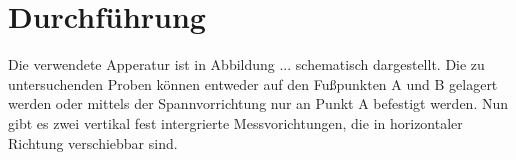 \section{Durchführung}
\label{sec:Durchführung}

Die verwendete Apperatur ist in Abbildung ... schematisch dargestellt.
Die zu untersuchenden Proben können entweder auf den Fußpunkten A und B 
gelagert werden oder mittels der Spannvorrichtung nur an Punkt A befestigt werden.
Nun gibt es zwei vertikal fest intergrierte Messvorichtungen, die in horizontaler Richtung 
verschiebbar sind.